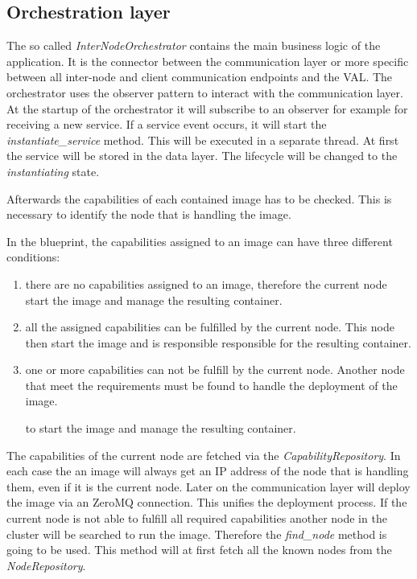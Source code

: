 \subsection{Orchestration layer}
The so called \textit{InterNodeOrchestrator} contains the main business logic of the application.
It is the connector between the communication layer or more specific between all inter-node and client communication endpoints and the \ac{VAL}.
The orchestrator uses the observer pattern to interact with the communication layer.
At the startup of the orchestrator it will subscribe to an observer for example for receiving a new service.
If a service event occurs, it will start the \textit{instantiate\_service} method.
This will be executed in a separate thread.
At first the service will be stored in the data layer.
The lifecycle will be changed to the \textit{instantiating} state.\newline

Afterwards the capabilities of each contained image has to be checked.
This is necessary to identify the node that is handling the image.\newline

In the blueprint, the capabilities assigned to an image can have three different conditions:
\begin{enumerate}
  \item there are no capabilities assigned to an image, therefore the current node start the image and manage the resulting container.
  \item all the assigned capabilities can be fulfilled by the current node. This node then start the image and is responsible responsible for the resulting container.
  \item one or more capabilities can not be fulfill by the current node. Another node that meet the requirements must be found to handle the deployment of the image.

   to start the image and manage the resulting container.
\end{enumerate}
\bigskip

The capabilities of the current node are fetched via the \textit{CapabilityRepository}.
In each case the an image will always get an \ac{IP} address of the node that is handling them, even if it is the current node.
Later on the communication layer will deploy the image via an ZeroMQ connection.
This unifies the deployment process.
If the current node is not able to fulfill all required capabilities another node in the cluster will be searched to run the image.
Therefore the \textit{find\_node} method is going to be used.
This method will at first fetch all the known nodes from the \textit{NodeRepository}.\newline

